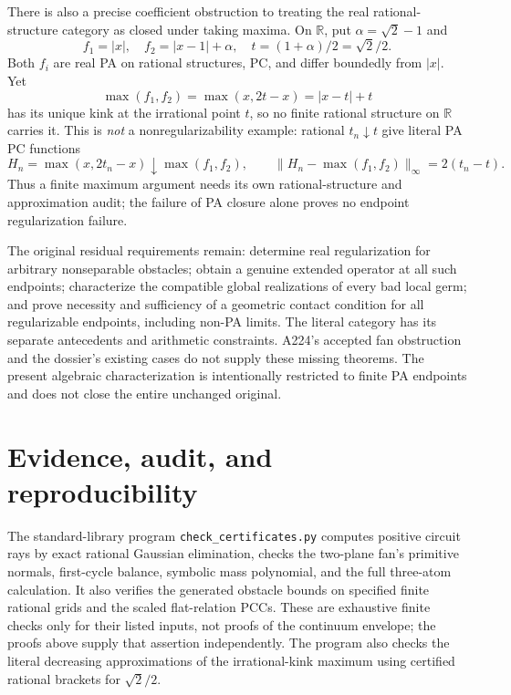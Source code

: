 \documentclass[11pt]{article}
\newcommand{\R}{\mathbb R}
\begin{document}
There is also a precise coefficient obstruction to treating the
real rational-structure category as closed under taking maxima.
On \(\R\), put \(\alpha=\sqrt2-1\) and
\[
 f_1=|x|,\quad f_2=|x-1|+\alpha,\quad
 t=(1+\alpha)/2=\sqrt2/2.
\]
Both \(f_i\) are real PA on rational structures, PC, and differ
boundedly from \(|x|\). Yet
\[
 \max(f_1,f_2)=\max(x,2t-x)=|x-t|+t
\]
has its unique kink at the irrational point \(t\), so no finite rational
structure on \(\R\) carries it. This is \emph{not} a nonregularizability
example: rational \(t_n\downarrow t\) give literal PA PC functions
\[
 H_n=\max(x,2t_n-x)\downarrow \max(f_1,f_2),\qquad
 \|H_n-\max(f_1,f_2)\|_\infty=2(t_n-t).
\]
Thus a finite maximum argument needs its own rational-structure and
approximation audit; the failure of PA closure alone proves no
endpoint regularization failure.

The original residual requirements remain: determine real regularization
for arbitrary nonseparable obstacles; obtain a genuine extended operator
at all such endpoints; characterize the compatible global realizations
of every bad local germ; and prove necessity and sufficiency of a
geometric contact condition for all regularizable endpoints, including
non-PA limits. The literal category has its separate antecedents and
arithmetic constraints. A224's accepted fan obstruction and the
dossier's existing cases do not supply these missing theorems.
The present algebraic characterization is intentionally restricted to
finite PA endpoints and does not close the entire unchanged original.

\section{Evidence, audit, and reproducibility}
The standard-library program \texttt{check\_certificates.py} computes
positive circuit rays by exact rational Gaussian elimination, checks
the two-plane fan's primitive normals, first-cycle balance, symbolic
mass polynomial, and the full three-atom calculation. It also verifies
the generated obstacle bounds on specified finite rational grids and
the scaled flat-relation PCCs. These are exhaustive finite checks only
for their listed inputs, not proofs of the continuum envelope; the
proofs above supply that assertion independently. The program also
checks the literal decreasing approximations of the irrational-kink
maximum using certified rational brackets for \(\sqrt2/2\).
\end{document}
